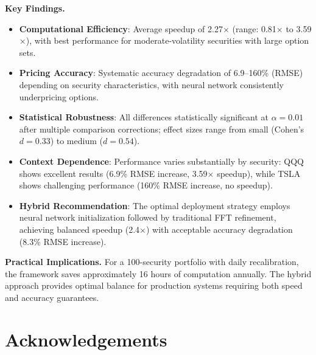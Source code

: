 \documentclass[12pt,a4paper]{article}
\begin{document}
\textbf{Key Findings.}

\begin{itemize}[noitemsep]

\item \textbf{Computational Efficiency}: Average speedup of 2.27$\times$ (range: 0.81$\times$ to 3.59$\times$), with best performance for moderate-volatility securities with large option sets.

\item \textbf{Pricing Accuracy}: Systematic accuracy degradation of 6.9--160\% (RMSE) depending on security characteristics, with neural network consistently underpricing options.

\item \textbf{Statistical Robustness}: All differences statistically significant at $\alpha = 0.01$ after multiple comparison corrections; effect sizes range from small (Cohen's $d = 0.33$) to medium ($d = 0.54$).

\item \textbf{Context Dependence}: Performance varies substantially by security: QQQ shows excellent results (6.9\% RMSE increase, 3.59$\times$ speedup), while TSLA shows challenging performance (160\% RMSE increase, no speedup).

\item \textbf{Hybrid Recommendation}: The optimal deployment strategy employs neural network initialization followed by traditional FFT refinement, achieving balanced speedup (2.4$\times$) with acceptable accuracy degradation (8.3\% RMSE increase).

\end{itemize}

\textbf{Practical Implications.} For a 100-security portfolio with daily recalibration, the framework saves approximately 16 hours of computation annually. The hybrid approach provides optimal balance for production systems requiring both speed and accuracy guarantees.




\newpage

\section*{Acknowledgements}

\end{document}

